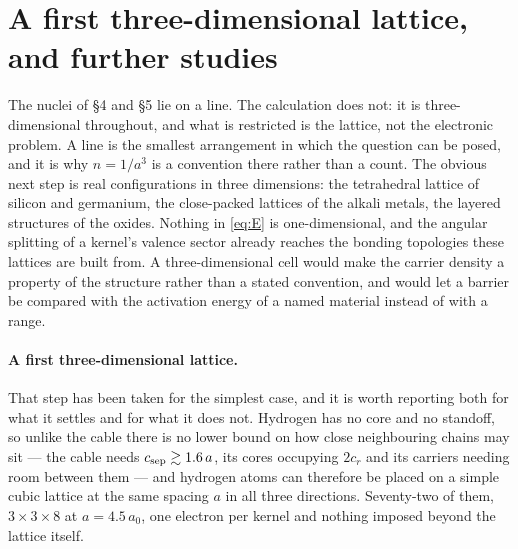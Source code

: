 \documentclass[11pt]{article}
\begin{document}
\section{A first three-dimensional lattice, and further studies}\label{sec:further}

The nuclei of \S4 and \S5 lie on a line. The calculation does not: it is three-dimensional
throughout, and what is restricted is the lattice, not the electronic problem. A line is the
smallest arrangement in which the question can be posed, and it is why $n=1/a^3$ is a convention
there rather than a count. The obvious
next step is real configurations in three dimensions: the tetrahedral lattice of silicon and
germanium, the close-packed lattices of the alkali metals, the layered structures of the oxides.
Nothing in \eqref{eq:E} is one-dimensional, and the angular splitting of a kernel's valence sector
already reaches the bonding topologies these lattices are built from. A three-dimensional cell would
make the carrier density a property of the structure rather than a stated convention, and would let
a barrier be compared with the activation energy of a named material instead of with a range.

\paragraph{A first three-dimensional lattice.} That step has been taken for the simplest case, and
it is worth reporting both for what it settles and for what it does not. Hydrogen has no core and no
standoff, so unlike the cable there is no lower bound on how close neighbouring chains may sit ---
the cable needs $c_{\rm sep}\gtrsim1.6\,a$, its cores occupying $2c_r$ and its carriers needing room
between them --- and hydrogen atoms can therefore be placed on a simple cubic lattice at the same
spacing $a$ in all three directions. Seventy-two of them, $3\times3\times8$ at $a=4.5\,a_0$, one
electron per kernel and nothing imposed beyond the lattice itself.
\end{document}
